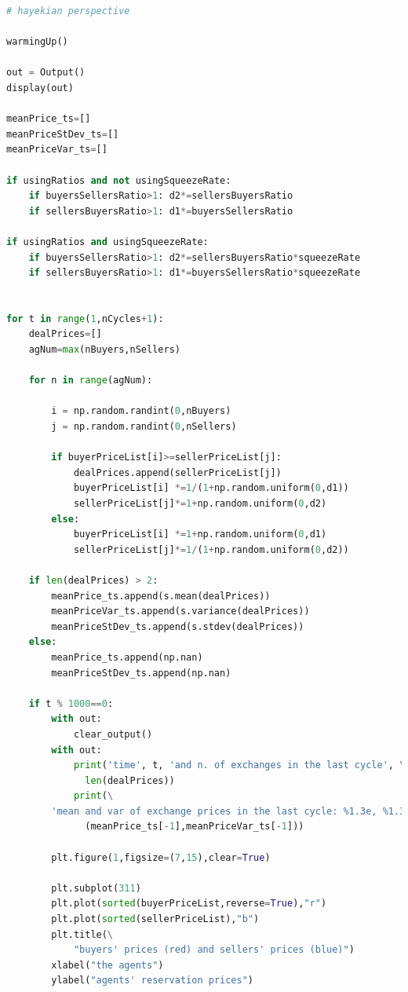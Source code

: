 \documentclass[10pt]{report}
\begin{document}
\begin{lstlisting}[language=Python, caption=The model in the simplified hayekian perspective, label={The model in the simplified hayekian perspective},basicstyle=\ttfamily\footnotesize]
# hayekian perspective

warmingUp()

out = Output()
display(out)

meanPrice_ts=[]
meanPriceStDev_ts=[]
meanPriceVar_ts=[]

if usingRatios and not usingSqueezeRate:
    if buyersSellersRatio>1: d2*=sellersBuyersRatio
    if sellersBuyersRatio>1: d1*=buyersSellersRatio
        
if usingRatios and usingSqueezeRate:
    if buyersSellersRatio>1: d2*=sellersBuyersRatio*squeezeRate
    if sellersBuyersRatio>1: d1*=buyersSellersRatio*squeezeRate
    

for t in range(1,nCycles+1):    
    dealPrices=[]
    agNum=max(nBuyers,nSellers)

    for n in range(agNum):

        i = np.random.randint(0,nBuyers)
        j = np.random.randint(0,nSellers)
        
        if buyerPriceList[i]>=sellerPriceList[j]:
            dealPrices.append(sellerPriceList[j])
            buyerPriceList[i] *=1/(1+np.random.uniform(0,d1))
            sellerPriceList[j]*=1+np.random.uniform(0,d2)
        else:
            buyerPriceList[i] *=1+np.random.uniform(0,d1)
            sellerPriceList[j]*=1/(1+np.random.uniform(0,d2))
           
    if len(dealPrices) > 2:
        meanPrice_ts.append(s.mean(dealPrices))
        meanPriceVar_ts.append(s.variance(dealPrices))
        meanPriceStDev_ts.append(s.stdev(dealPrices))
    else:
        meanPrice_ts.append(np.nan)
        meanPriceStDev_ts.append(np.nan)

    if t % 1000==0:
        with out:
            clear_output()
        with out:
            print('time', t, 'and n. of exchanges in the last cycle', \
              len(dealPrices))
            print(\
        'mean and var of exchange prices in the last cycle: %1.3e, %1.3e' %\
              (meanPrice_ts[-1],meanPriceVar_ts[-1]))

        plt.figure(1,figsize=(7,15),clear=True)

        plt.subplot(311)
        plt.plot(sorted(buyerPriceList,reverse=True),"r")
        plt.plot(sorted(sellerPriceList),"b")
        plt.title(\
            "buyers' prices (red) and sellers' prices (blue)")
        xlabel("the agents")
        ylabel("agents' reservation prices")


\end{lstlisting}
\end{document}
